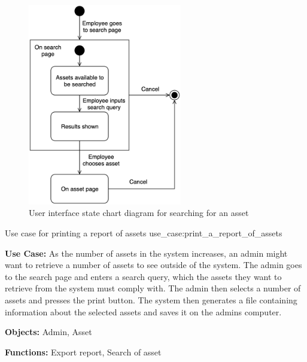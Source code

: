 \begin{figure}[H]
    \centering
    \includegraphics[width=0.6\textwidth]{figures/UseCases/UC_Search_asset.png}
    \caption{User interface state chart diagram for searching for an asset}
    \label{fig:search_asset_statechart}
\end{figure}

    {Use case for printing a report of assets}
    {use_case:print_a_report_of_assets}
    {
        \textbf{Use Case:} As the number of assets in the system increases, an admin might want to retrieve a number of assets to see outside of the system. The admin goes to the search page and enters a search query, which the assets they want to retrieve from the system must comply with. The admin then selects a number of assets and presses the print button. The system then generates a file containing information about the selected assets and saves it on the admins computer.
    
        \vskip 0.2cm
        
        \textbf{Objects:} Admin, Asset
        
        \vskip 0.2cm
        
        \textbf{Functions:} Export report, Search of asset
    }

